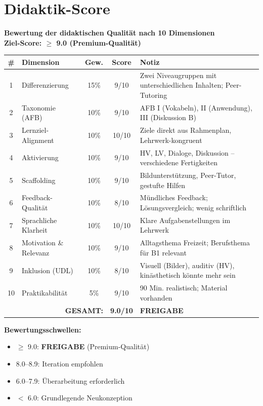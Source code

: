 \documentclass[11pt,a4paper]{article}
\begin{document}
\newpage
\section{Didaktik-Score}

\begin{scorebox}
\textbf{Bewertung der didaktischen Qualität nach 10 Dimensionen}\\
\textbf{Ziel-Score: $\geq$ 9.0 (Premium-Qualität)}

\vspace{1em}
\begin{tabular}{|c|l|c|c|p{4.5cm}|}
\hline
\textbf{\#} & \textbf{Dimension} & \textbf{Gew.} & \textbf{Score} & \textbf{Notiz} \\
\hline
1 & Differenzierung & 15\% & 9/10 & Zwei Niveaugruppen mit unterschiedlichen Inhalten; Peer-Tutoring \\
\hline
2 & Taxonomie (AFB) & 10\% & 9/10 & AFB I (Vokabeln), II (Anwendung), III (Diskussion B) \\
\hline
3 & Lernziel-Alignment & 10\% & 10/10 & Ziele direkt aus Rahmenplan, Lehrwerk-kongruent \\
\hline
4 & Aktivierung & 10\% & 9/10 & HV, LV, Dialoge, Diskussion -- verschiedene Fertigkeiten \\
\hline
5 & Scaffolding & 10\% & 9/10 & Bildunterstützung, Peer-Tutor, gestufte Hilfen \\
\hline
6 & Feedback-Qualität & 10\% & 8/10 & Mündliches Feedback; Lösungsvergleich; wenig schriftlich \\
\hline
7 & Sprachliche Klarheit & 10\% & 10/10 & Klare Aufgabenstellungen im Lehrwerk \\
\hline
8 & Motivation \& Relevanz & 10\% & 9/10 & Alltagsthema Freizeit; Berufsthema für B1 relevant \\
\hline
9 & Inklusion (UDL) & 10\% & 8/10 & Visuell (Bilder), auditiv (HV), kinästhetisch könnte mehr sein \\
\hline
10 & Praktikabilität & 5\% & 9/10 & 90 Min. realistisch; Material vorhanden \\
\hline
\multicolumn{3}{|r|}{\textbf{GESAMT:}} & \textbf{9.0/10} & \textcolor{successgreen}{\textbf{FREIGABE}} \\
\hline
\end{tabular}

\vspace{1em}
\textbf{Bewertungsschwellen:}
\begin{itemize}
    \item[\checkmark] \textcolor{successgreen}{$\geq$ 9.0: \textbf{FREIGABE} (Premium-Qualität)}
    \item[$\Box$] \textcolor{warningorange}{8.0--8.9: Iteration empfohlen}
    \item[$\Box$] 6.0--7.9: Überarbeitung erforderlich
    \item[$\Box$] $<$ 6.0: Grundlegende Neukonzeption
\end{itemize}


\end{scorebox}
\end{document}
